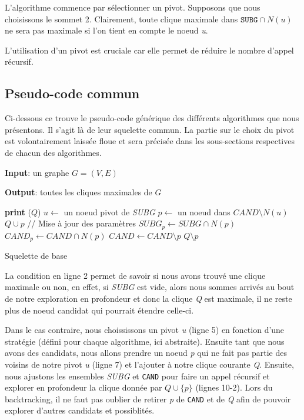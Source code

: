 \documentclass[12pt,a4paper]{article}
\begin{document}
L'algorithme commence par sélectionner un pivot. Supposons que nous choisissons le sommet 2.
Clairement, toute clique maximale dans \(\texttt{SUBG} \cap N(u)\) ne sera pas maximale si l'on tient en compte le noeud \emph{u}.

L'utilisation d'un pivot est cruciale car elle permet de réduire le nombre d'appel récursif.

\subsection{Pseudo-code commun}%
\label{subsec:algo}

Ci-dessous ce trouve le pseudo-code générique des différents algorithmes que nous présentons. Il s'agit là de leur squelette commun. La partie sur le choix du pivot est volontairement laissée floue et sera précisée dans les sous-sections respectives de chacun des algorithmes.

\begin{algorithm}[H]
  \textbf{Input}: un graphe $G = (V,E)$

  \textbf{Output}: toutes les cliques maximales de $G$
  \begin{algorithmic}[1]
       
        \State \textbf{print} ($ Q $)
      \Else
        \State $u \gets$ un noeud pivot de \emph{SUBG}
          \State $p \gets$ un noeud dans $CAND \setminus N(u)$
          \State $ Q \cup p $ 
          \State // Mise à jour des paramètres
          \State $SUBG_p \gets SUBG \cap N(p)$
          \State $CAND_p \gets CAND \cap N(p)$
          \State {}
          \State $CAND \gets CAND \setminus {p}$
          \State $ Q \setminus p $ 
        \EndWhile
      \EndIf
    \EndProcedure
    \State {}
  \end{algorithmic}
  \caption{Squelette de base}
  \label{fig:alg}
\end{algorithm}

La condition en ligne 2 permet de savoir si nous avons trouvé une clique maximale ou non, en effet, si \emph{SUBG} est vide, alors nous sommes arrivés au bout de notre exploration en profondeur et donc la clique \emph{Q} est maximale, il ne reste plus de noeud candidat qui pourrait étendre celle-ci.

Dans le cas contraire, nous choississons un pivot \emph{u} (ligne 5) en fonction d'une stratégie (défini pour chaque algorithme, ici abstraite). Ensuite tant que nous avons des candidats, nous allons prendre un noeud \emph{p} qui ne fait pas partie des voisins de notre pivot \emph{u} (ligne 7) et l'ajouter à notre clique courante \emph{Q}. Ensuite, nous ajustons les ensembles \emph{SUBG} et \texttt{CAND} pour faire un appel récursif et explorer en profondeur la clique donnée par \(Q \cup \{p\}\) (lignes 10-2).
Lors du backtracking, il ne faut pas oublier de retirer \emph{p} de \texttt{CAND} et de \emph{Q} afin de pouvoir explorer d'autres candidats et possiblités.
\end{document}
